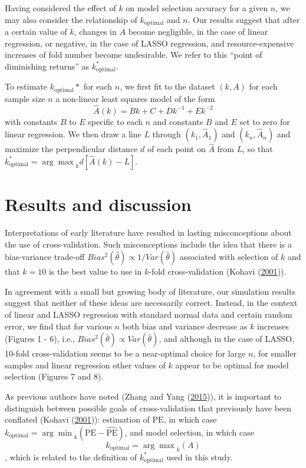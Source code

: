 \documentclass[
  12pt,
]{article}
\begin{document}
Having considered the effect of \(k\) on model selection accuracy for a
given \(n\), we may also consider the relationship of
\(k_\mathrm{optimal}\) and \(n\). Our results suggest that after a
certain value of \(k\), changes in \(A\) become negligible, in the case
of linear regression, or negative, in the case of LASSO regression, and
resource-expensive increases of fold number become undesirable. We refer
to this ``point of diminishing returns'' as \(k_\mathrm{optimal}^*\).

To estimate \(k_\mathrm{optimal}*\) for each \(n\), we first fit to the
dataset \((k,A)\) for each sample size \(n\) a non-linear least squares
model of the form \[\hat{A}(k) = Bk + C + Dk^{-1} + Ek^{-2}\] with
constants \(B\) to \(E\) specific to each \(n\) and constants \(B\) and
\(E\) set to zero for linear regression. We then draw a line \(L\)
through \((k_1, \hat{A}_1)\) and \((k_n, \hat{A}_n)\) and maximize the
perpendicular distance \(d\) of each point on \(\hat{A}\) from \(L\), so
that \(k_\mathrm{optimal}^* = {\arg\max}_k{d[\hat{A}(k)-L]}\).

\hypertarget{results-and-discussion}{%
\section{Results and discussion}\label{results-and-discussion}}

Interpretations of early literature have resulted in lasting
misconceptions about the use of cross-validation. Such misconceptions
include the idea that there is a bias-variance trade-off
\(Bias^2(\hat{\theta}) \propto 1/Var(\hat{\theta})\) associated with
selection of \(k\) and that \(k = 10\) is the best value to use in
\(k\)-fold cross-validation (Kohavi
(\protect\hyperlink{ref-Kohavi2001}{2001})).

In agreement with a small but growing body of literature, our simulation
results suggest that neither of these ideas are necessarily correct.
Instead, in the context of linear and LASSO regression with standard
normal data and certain random error, we find that for various \(n\)
both bias and variance decrease as \(k\) increases (Figures 1 - 6),
i.e., \(Bias^2(\hat{\theta}) \propto Var(\hat{\theta})\), and although
in the case of LASSO, 10-fold cross-validation seems to be a
near-optimal choice for large \(n\), for smaller samples and linear
regression other values of \(k\) appear to be optimal for model
selection (Figures 7 and 8).

As previous authors have noted (Zhang and Yang
(\protect\hyperlink{ref-Zhang2015}{2015})), it is important to
distinguish between possible goals of cross-validation that previously
have been conflated (Kohavi (\protect\hyperlink{ref-Kohavi2001}{2001})):
estimation of \(\mathrm{PE}\), in which case
\(k_\mathrm{optimal} = {\arg\min}_{k}(\mathrm{PE} - \mathrm{\widehat{PE}})\),
and model selection, in which case
\[k_\mathrm{optimal} = {\arg\max}_k(A)\], which is related to the
definition of \(k_\mathrm{optimal}^*\) used in this study.
\end{document}

